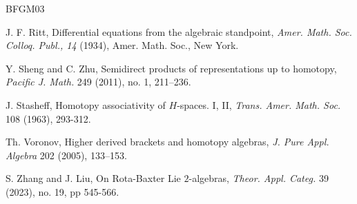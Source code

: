 \documentclass[a4paper,reqno,10pt]{amsart}
\theoremstyle{plain}
\theoremstyle{definition}
\theoremstyle{remark}
\begin{document}
\begin{thebibliography}{BFGM03}

  J. F. Ritt, Differential equations from the algebraic standpoint, {\em Amer. Math. Soc. Colloq. Publ., 14} (1934), Amer. Math. Soc., New York.




 Y. Sheng and C. Zhu, Semidirect products of representations up to homotopy, {\em Pacific J. Math.} 249 (2011), no. 1, 211–236.

 J. Stasheff, Homotopy associativity of $H$-spaces. I, II, {\em Trans. Amer. Math. Soc.} 108 (1963), 293-312.



  Th. Voronov, Higher derived brackets and homotopy algebras, {\em J. Pure Appl. Algebra} 202 (2005), 133--153.

    S. Zhang and J. Liu, On Rota-Baxter Lie $2$-algebras, {\em Theor. Appl. Categ.} 39 (2023), no. 19, pp 545-566.

\end{thebibliography}
\end{document}
